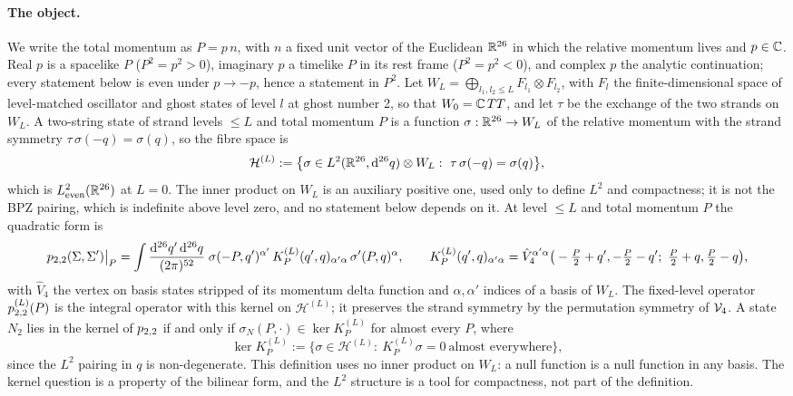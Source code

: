 \paragraph{The object.}
We write the total momentum as $P = p \, n$, with $n$ a fixed unit vector of the Euclidean $\mathbb{R}^{26}$ in which the relative momentum lives and $p \in \mathbb{C}$.
Real $p$ is a spacelike $P$ ($P^2 = p^2 > 0$), imaginary $p$ a timelike $P$ in its rest frame ($P^2 = p^2 < 0$), and complex $p$ the analytic continuation; every statement below is even under $p \to - p$, hence a statement in $P^2$.
Let $W_L = \bigoplus_{l_1, l_2 \le L} F_{l_1} \otimes F_{l_2}$, with $F_l$ the finite-dimensional space of level-matched oscillator and ghost states of level $l$ at ghost number 2, so that $W_0 = \mathbb{C} \, TT$, and let $\tau$ be the exchange of the two strands on $W_L$.
A two-string state of strand levels $\le L$ and total momentum $P$ is a function $\sigma: \mathbb{R}^{26} \to W_L$ of the relative momentum with the strand symmetry $\tau \, \sigma(- q) = \sigma(q)$, so the fibre space is
\begin{equation}
  \label{eq:mom:fibre}
  \mathcal H^{(L)}
    := \big\{ \sigma \in L^2(\mathbb{R}^{26}, \mathrm{d}^{26} q) \otimes W_L :\ \tau \, \sigma(- q) = \sigma(q) \big\},
\end{equation}
which is $L^2_{\rm even}(\mathbb{R}^{26})$ at $L = 0$.
The inner product on $W_L$ is an auxiliary positive one, used only to define $L^2$ and compactness; it is not the BPZ pairing, which is indefinite above level zero, and no statement below depends on it.
At level $\le L$ and total momentum $P$ the quadratic form is
\begin{equation}
  \label{eq:mom:fixed-level-form}
  p_{2,2}(\Sigma, \Sigma') \big|_P
    = \int \frac{\mathrm{d}^{26} q' \, \mathrm{d}^{26} q}{(2\pi)^{52}} \;
      \sigma(- P, q')^{\alpha'} \, K^{(L)}_P(q', q)_{\alpha' \alpha} \, \sigma'(P, q)^{\alpha},
  \qquad
  K^{(L)}_P(q', q)_{\alpha' \alpha}
    = \hat V_4^{\alpha' \alpha}\big( - \tfrac{P}{2} + q', - \tfrac{P}{2} - q';\ \tfrac{P}{2} + q, \tfrac{P}{2} - q \big),
\end{equation}
with $\hat V_4$ the vertex on basis states stripped of its momentum delta function and $\alpha, \alpha'$ indices of a basis of $W_L$.
The fixed-level operator $p_{2,2}^{(L)}(P)$ is the integral operator with this kernel on $\mathcal H^{(L)}$; it preserves the strand symmetry by the permutation symmetry of $\mathcal{V}_{4}$.
A state $N_2$ lies in the kernel of $p_{2,2}$ if and only if $\sigma_N(P, \cdot) \in \ker K^{(L)}_P$ for almost every $P$, where
\begin{equation}
  \label{eq:mom:null-functions}
  \ker K^{(L)}_P
    := \big\{ \sigma \in \mathcal H^{(L)} :\ K^{(L)}_P \sigma = 0 \ \text{almost everywhere} \big\},
\end{equation}
since the $L^2$ pairing in $q$ is non-degenerate.
This definition uses no inner product on $W_L$: a null function is a null function in any basis.
The kernel question is a property of the bilinear form, and the $L^2$ structure is a tool for compactness, not part of the definition.

